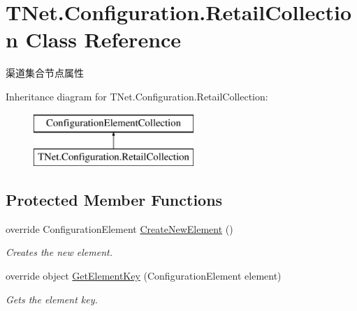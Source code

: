 \hypertarget{class_t_net_1_1_configuration_1_1_retail_collection}{}\section{T\+Net.\+Configuration.\+Retail\+Collection Class Reference}
\label{class_t_net_1_1_configuration_1_1_retail_collection}


渠道集合节点属性  


Inheritance diagram for T\+Net.\+Configuration.\+Retail\+Collection\+:\begin{figure}[H]
\begin{center}
\leavevmode
\includegraphics[height=2.000000cm]{class_t_net_1_1_configuration_1_1_retail_collection}
\end{center}
\end{figure}
\subsection*{Protected Member Functions}
\begin{DoxyCompactItemize}
\item 
override Configuration\+Element \mbox{\hyperlink{class_t_net_1_1_configuration_1_1_retail_collection_af0827ebba5c6cbeb2fb73513bf2b1136}{Create\+New\+Element}} ()
\begin{DoxyCompactList}\small\item\em Creates the new element. \end{DoxyCompactList}\item 
override object \mbox{\hyperlink{class_t_net_1_1_configuration_1_1_retail_collection_a0951fe11e2aefcdc9c97b335a7d5910f}{Get\+Element\+Key}} (Configuration\+Element element)
\begin{DoxyCompactList}\small\item\em Gets the element key. \end{DoxyCompactList}\end{DoxyCompactItemize}
